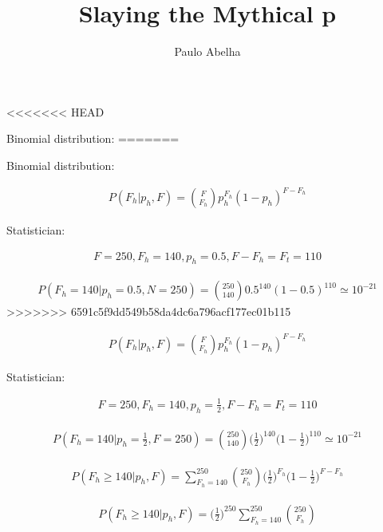 \documentclass[12pt]{article}
\begin{document}
 

\pagecolor{blogger-black}
\color{white} 
 
\title{Slaying the Mythical p}
\author{Paulo Abelha}
\maketitle
<<<<<<< HEAD

Binomial distribution:
=======

Binomial distribution:

\begin{gather}
P(F_h | p_h, F) = \binom{F}{F_h}p_h^{F_h}(1-p_h)^{F-F_h}
\end{gather}

Statistician:

\begin{gather}
F = 250, F_h = 140, p_h = 0.5, F-F_h = F_t = 110
\end{gather}

\begin{gather}
P(F_h = 140 | p_h =0.5, N=250) = \binom{250}{140}0.5^{140}(1-0.5)^{110} \simeq 10^{-21}
\end{gather}
>>>>>>> 6591c5f9dd549b58da4dc6a796acf177ec01b115

\begin{gather}
P(F_h | p_h, F) = \binom{F}{F_h}p_h^{F_h}(1-p_h)^{F-F_h}
\end{gather}

Statistician:

\begin{gather}
F = 250, F_h = 140, p_h = \frac{1}{2}, F-F_h = F_t = 110
\end{gather}

\begin{gather}
P(F_h = 140 | p_h =\frac{1}{2}, F=250) = \binom{250}{140}\Big(\frac{1}{2}\Big)^{140}\Big(1-\frac{1}{2}\Big)^{110} \simeq 10^{-21}
\end{gather}

\begin{gather}
P(F_h \geq 140 | p_h, F) = \sum_{F_h=140}^{250} \binom{250}{F_h}\Big(\frac{1}{2}\Big)^{F_h}\Big(1-\frac{1}{2}\Big)^{F-F_h}
\end{gather}

\begin{gather}
P(F_h \geq 140 | p_h, F) = \Big(\frac{1}{2}\Big)^{250} \sum_{F_h=140}^{250} \binom{250}{F_h}
\end{gather}
\end{document}
